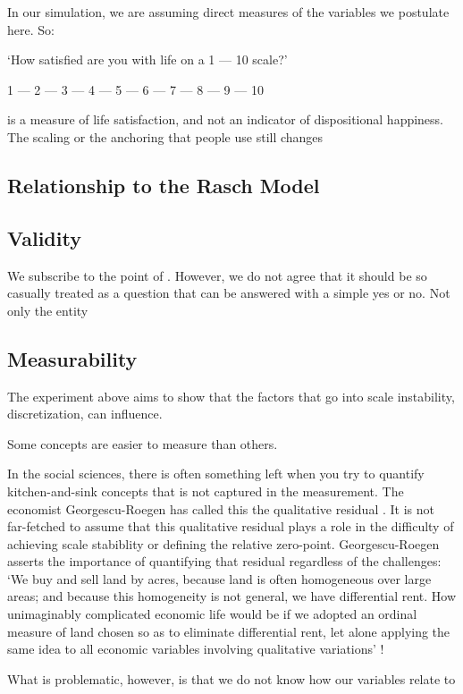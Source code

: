 \documentclass[utf8]{FrontiersinVancouver}
\begin{document}
In our simulation, we are assuming direct measures of the variables we postulate here. So:

`How satisfied are you with life on a 1 --- 10 scale?'

1 --- 2 --- 3 --- 4 --- 5 --- 6 --- 7 --- 8 --- 9 --- 10

is a measure of life satisfaction, and not an indicator of dispositional happiness. The scaling or the anchoring that people use still changes 

\subsection{Relationship to the Rasch Model}

\subsection{Validity}
We subscribe to the point of . However, we do not agree that it should be so casually treated as a question that can be answered with a simple yes or no. Not only the entity 

\subsection{Measurability}
The experiment above aims to show that the factors that go into scale instability, discretization, can influence. 

Some concepts are easier to measure than others. 

In the social sciences, there is often something left when you try to quantify kitchen-and-sink concepts that is not captured in the measurement. The economist Georgescu-Roegen has called this the qualitative residual \citep{georgescu-roegenMeasureQualityOptimum1965}. It is not far-fetched to assume that this qualitative residual plays a role in the difficulty of achieving scale stabiblity or defining the relative zero-point. Georgescu-Roegen asserts the importance of quantifying that residual regardless of the challenges: `We buy and sell land by acres, because land is often homogeneous over large areas; and because this homogeneity is not general, we have differential rent. How unimaginably complicated economic life would be if we adopted an ordinal measure of land chosen so as to eliminate differential rent, let alone applying the same idea to all economic variables involving qualitative variations' \citep{georgescu-roegenMeasureQualityOptimum1965}!


What is problematic, however, is that we do not know how our variables relate to 
\end{document}
